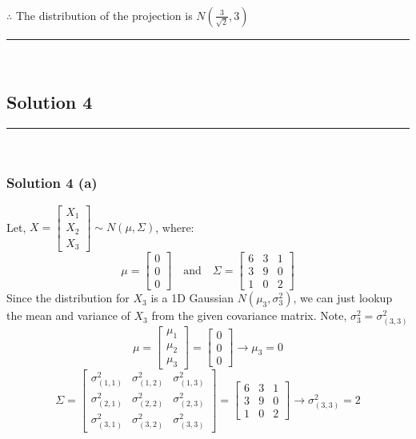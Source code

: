 \documentclass{article}
\begin{document}
\subsubsection*{\normalfont}{$\therefore$ The distribution of the projection is $N\left(\frac{3}{\sqrt{2}}, 3\right)$}

\noindent\rule{\textwidth}{0.4pt}\\

\newpage

\subsection*{Solution 4}
\noindent\rule{\textwidth}{0.4pt}\\
\subsubsection*{Solution 4 (a)}
Let, $X = \begin{bmatrix} X_1 \\ X_2 \\ X_3 \end{bmatrix} \sim N(\mu, \Sigma)$, where:
$$ \mu = \begin{bmatrix} 0 \\ 0 \\ 0 \end{bmatrix} \quad \text{and} \quad \Sigma = \begin{bmatrix} 6 & 3 & 1 \\ 3 & 9 & 0 \\ 1 & 0 & 2 \end{bmatrix} $$
Since the distribution for $X_3$ is a 1D Gaussian $N(\mu_3, \sigma_{3}^2)$, we can just lookup the mean and variance of $X_3$ from the given covariance matrix. Note, $\sigma_{3}^2 = \sigma_{(3,3)}^2$
$$\mu = \begin{bmatrix} \mu_1 \\ \mu_2 \\ \mu_3 \end{bmatrix} = \begin{bmatrix} 0 \\ 0 \\ 0 \end{bmatrix} \rightarrow \mu_3 = 0 $$
$$\Sigma = \begin{bmatrix} \sigma_{(1,1)}^2 & \sigma_{(1,2)}^2 & \sigma_{(1,3)}^2 \\ \sigma_{(2,1)}^2 & \sigma_{(2,2)}^2 & \sigma_{(2,3)}^2 \\ \sigma_{(3,1)}^2 & \sigma_{(3,2)}^2 & \sigma_{(3,3)}^2 \end{bmatrix} = \begin{bmatrix} 6 & 3 & 1 \\ 3 & 9 & 0 \\ 1 & 0 & 2 \end{bmatrix} \rightarrow \sigma_{(3,3)}^2 = 2$$ 
\end{document}
